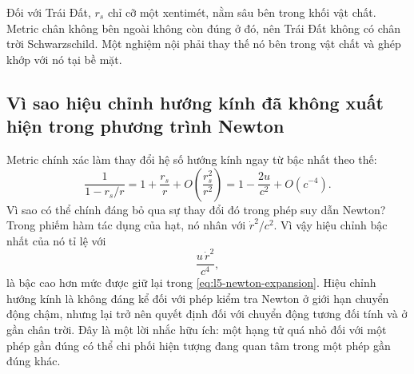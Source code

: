 \begin{classroomqa}
\end{classroomqa}

\begin{classroomqa}
\end{classroomqa}

Đối với Trái Đất, \(r_s\) chỉ cỡ một xentimét, nằm sâu bên trong khối vật chất. Metric chân không bên ngoài không còn đúng ở đó, nên Trái Đất không có chân trời Schwarzschild. Một nghiệm nội phải thay thế nó bên trong vật chất và ghép khớp với nó tại bề mặt.

\begin{classroomqa}
\end{classroomqa}

\subsection{Vì sao hiệu chỉnh hướng kính đã không xuất hiện trong phương trình Newton}

Metric chính xác làm thay đổi hệ số hướng kính ngay từ bậc nhất theo thế:
\begin{equation}
\frac{1}{1-r_s/r}
=1+\frac{r_s}{r}
+O\!\left(\frac{r_s^2}{r^2}\right)
=1-\frac{2u}{c^2}+O(c^{-4}).
\label{eq:l5-radial-expansion}
\end{equation}
Vì sao có thể chính đáng bỏ qua sự thay đổi đó trong phép suy dẫn Newton? Trong phiếm hàm tác dụng của hạt, nó nhân với \(\dot r^2/c^2\). Vì vậy hiệu chỉnh bậc nhất của nó tỉ lệ với
\begin{equation}
\frac{u\,\dot r^2}{c^4},
\end{equation}
là bậc cao hơn mức được giữ lại trong
\eqref{eq:l5-newton-expansion}. Hiệu chỉnh hướng kính là không đáng kể đối với phép kiểm tra Newton ở giới hạn chuyển động chậm, nhưng lại trở nên quyết định đối với chuyển động tương đối tính và ở gần chân trời. Đây là một lời nhắc hữu ích: một hạng tử quá nhỏ đối với một phép gần đúng có thể chi phối hiện tượng đang quan tâm trong một phép gần đúng khác.

